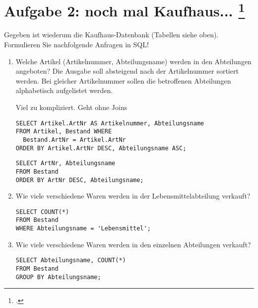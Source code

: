 \documentclass{lehramt-informatik-aufgabe}
\begin{document}

\section{Aufgabe 2: noch mal Kaufhaus...
\footcite{db:ab:7}}

Gegeben ist wiederum die Kaufhaus-Datenbank (Tabellen siehe oben).
Formulieren Sie nachfolgende Anfragen in SQL!

\begin{enumerate}


\item Welche Artikel (Artikelnummer, Abteilungsname) werden in den
Abteilungen angeboten? Die Ausgabe soll absteigend nach der
Artikelnummer sortiert werden. Bei gleicher Artikelnummer sollen die
betroffenen Abteilungen alphabetisch aufgelistet werden.

\begin{antwort}[richtig]
Viel zu kompliziert. Geht ohne Joins
\begin{verbatim}
SELECT Artikel.ArtNr AS Artikelnummer, Abteilungsname
FROM Artikel, Bestand WHERE
  Bestand.ArtNr = Artikel.ArtNr
ORDER BY Artikel.ArtNr DESC, Abteilungsname ASC;
\end{verbatim}
\end{antwort}

\begin{antwort}[muster]
\begin{verbatim}
SELECT ArtNr, Abteilungsname
FROM Bestand
ORDER BY ArtNr DESC, Abteilungsname;
\end{verbatim}
\end{antwort}

\item Wie viele verschiedene Waren werden in der Lebensmittelabteilung
verkauft?

\begin{antwort}[muster]
\begin{verbatim}
SELECT COUNT(*)
FROM Bestand
WHERE Abteilungsname = 'Lebensmittel';
\end{verbatim}
\end{antwort}


\item Wie viele verschiedene Waren werden in den einzelnen Abteilungen
verkauft?

\begin{antwort}[muster]
\begin{verbatim}
SELECT Abteilungsname, COUNT(*)
FROM Bestand
GROUP BY Abteilungsname;
\end{verbatim}
\end{antwort}


\end{enumerate}
\end{document}
